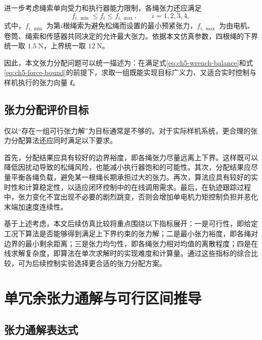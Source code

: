 进一步考虑绳索单向受力和执行器能力限制，各绳张力还应满足
\begin{equation}
  f_{i,\min}\le f_i\le f_{i,\max},\qquad i=1,2,3,4, \label{eq:ch5-force-bound}
\end{equation}
式中，$f_{i,\min}$ 为第$i$根绳索为避免松绳而设置的最小预紧张力，$f_{i,\max}$ 为由电机、卷筒、绳索和传感器共同决定的允许最大张力。依据本文仿真参数，四根绳的下界统一取 $1.5\ \mathrm N$，上界统一取 $12\ \mathrm N$。

因此，本文张力分配问题可以统一描述为：在满足式\eqref{eq:ch5-wrench-balance}和式\eqref{eq:ch5-force-bound}的前提下，求取一组既能实现目标广义力、又适合实时控制与样机执行的张力向量 $\bm f$。

\subsection{张力分配评价目标}

仅以“存在一组可行张力解”为目标通常是不够的。对于实际样机系统，更合理的张力分配算法还应同时满足以下要求。

首先，分配结果应具有较好的边界裕度，即各绳张力尽量远离上下界。这样既可以降低因扰动导致的松绳风险，也能减小执行器饱和的可能性。其次，分配结果应尽量平衡各绳负载，避免某一根绳长期承担过大的张力。再次，算法应具有较好的实时性和计算稳定性，以适应闭环控制中的在线调用需求。最后，在轨迹跟踪过程中，张力变化不宜出现不必要的剧烈跳变，否则会增加单电机力矩控制负担并恶化末端加速度连续性\cite{cao2023realtimetension,song2024realtimemethod,wang2024dynamictension}。

基于上述考虑，本文后续仿真比较将重点围绕以下指标展开：一是可行性，即给定工况下算法是否能够得到满足上下界约束的张力解；二是最小张力裕度，即各绳对边界的最小剩余距离；三是张力均匀性，即各绳张力相对均值的离散程度；四是在线求解复杂度，即算法在单次求解时的实现难度和计算量。通过这些指标的综合比较，可为后续控制实验选择更合适的张力分配方案。

\section{单冗余张力通解与可行区间推导}

\subsection{张力通解表达式}


